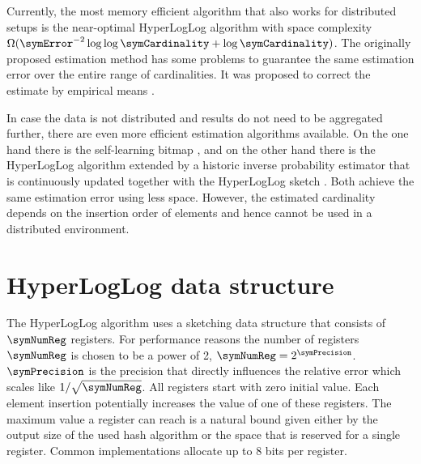 \documentclass[a4paper]{scrartcl}
\begin{document}
Currently, the most memory efficient algorithm that also works for distributed setups is the near-optimal HyperLogLog algorithm \cite{Flajolet2007} with space complexity $\Omega(\symError^{-2} \log\log\symCardinality +\log \symCardinality)$. The originally proposed estimation method has some problems to guarantee the same estimation error over the entire range of cardinalities. It was proposed to correct the estimate by empirical means \cite{Heule2013,Rhodes2015,Sanfilippo2014}. 

In case the data is not distributed and results do not need to be aggregated further, there are even more efficient estimation algorithms available. On the one hand there is the self-learning bitmap \cite{Chen2011}, and on the other hand there is the HyperLogLog algorithm extended by a historic inverse probability estimator that is continuously updated together with the HyperLogLog sketch \cite{Ting2014}. Both achieve the same estimation error using less space. However, the estimated cardinality depends on the insertion order of elements and hence cannot be used in a distributed environment. 


\section{HyperLogLog data structure}
The HyperLogLog algorithm uses a sketching data structure that consists of $\symNumReg$ registers. For performance reasons the number of registers $\symNumReg$ is chosen to be a power of 2, $\symNumReg = 2^\symPrecision$. $\symPrecision$ is the precision that directly influences the relative error which scales like $1/\sqrt{\symNumReg}$. All registers start with zero initial value. Each element insertion potentially increases the value of one of these registers. The maximum value a register can reach is a natural bound given either by the output size of the used hash algorithm or the space that is reserved for a single register. Common implementations allocate up to 8 bits per register.
\end{document}
